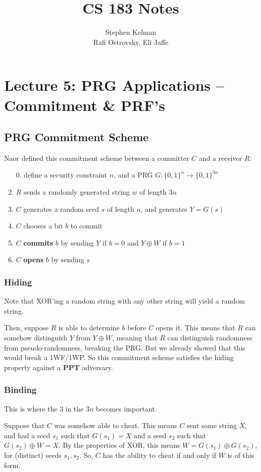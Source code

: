 \documentclass[11pt]{article}
\title{CS 183 Notes}
\author{Stephen Kelman\\ Rafi Ostrovsky, Eli Jaffe}
\newcommand{\PPT}{\mathbf{PPT}}
\begin{document}
\section{Lecture 5: PRG Applications -- Commitment \& PRF's}

\subsection{PRG Commitment Scheme}
Naor defined this commitment scheme between a committer \(C\) and a receiver \(R\):
\begin{enumerate}
\item [0.] define a security constraint \(n\), and a PRG \(G:\{0,1\}^n\to \{0,1\}^{3n}\)
\item \(R\) sends a randomly generated string \(w\) of length \(3n\)
\item \(C\) generates a random seed \(s\) of length \(n\), and generates \(Y=G(s)\)
\item \(C\) chooses a bit \(b\) to commit
\item \(C\) \textbf{commits} \(b\)  by sending \(Y\) if \(b=0\) and \(Y\oplus W\) if \(b=1\)
\item \(C\) \textbf{opens} \(b\) by sending \(s\)
\end{enumerate}

\subsubsection{Hiding}
Note that XOR'ing a random string with any other string will yield a random string. \medskip

Then, suppose \(R\) is able to determine \(b\) before \(C\) opens it. This means that \(R\) can somehow distinguish \(Y\) from \(Y\oplus W\), meaning that \(R\) can distinguish randomness from pseudo-randomness, breaking the PRG. But we already showed that this would break a 1WF/1WP. So this commitment scheme satisfies the hiding property against a \(\PPT\) adversary.

\subsubsection{Binding}
This is where the \(3\) in the \(3n\) becomes important.\medskip

Suppose that \(C\) was somehow able to cheat. This means \(C\) sent some string \(X\), and had a seed \(s_1\) such that \(G(s_1)=X\) and a seed \(s_2\) such that \(G(s_2)\oplus W = X\). By the properties of XOR, this means \(W=G(s_1)\oplus G(s_2)\), for (distinct) seeds \(s_1,s_2\). So, \(C\) has the ability to cheat if and only if \(W\) is of this form.\medskip
\end{document}
